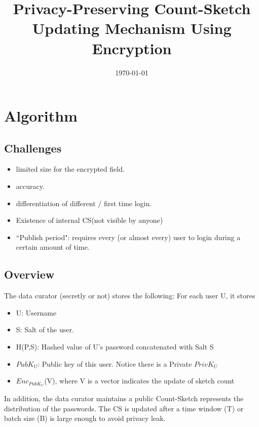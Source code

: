 \documentclass[]{article}
\begin{document}
\title{Privacy-Preserving Count-Sketch Updating Mechanism Using Encryption}
\date{\today}
\maketitle

\section{Algorithm}
\subsection{Challenges}
\begin{itemize}
	\item limited size for the encrypted field.
	\item accuracy.
	\item differentiation of different / first time login.
	\item Existence of internal CS(not visible by anyone)
	\item ``Publish period": requires every (or almost every) user to login during a certain amount of time.
\end{itemize}
\subsection{Overview}
The data curator (secretly or not) stores the following: For each user U, it stores 
\begin{itemize}
	\item U: Username
	\item S:  Salt of the user. 
	\item H(P,S): Hashed value of U's password concatenated with Salt S
	\item $PubK_{U}$:  Public key of this user. Notice there is a Private $PrivK_U$
	\item $Enc_{PubK_{U}}$(V), where V is a vector indicates the update of sketch count
	\end{itemize}
In addition, the data curator maintains a public Count-Sketch represents the distribution of the passwords. The CS is updated after a time window (T) or batch size (B) is large enough to avoid privacy leak.  
\end{document}
